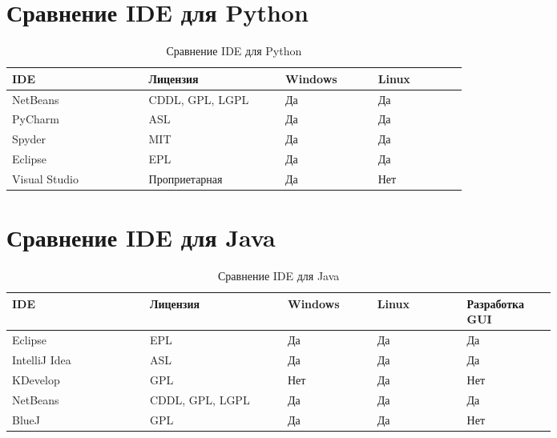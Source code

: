 \section{Сравнение IDE для Python}
\begin{table}[h!]
    \caption{Сравнение IDE для Python}
    \centering
    \begin{tabular}[h!]{| p{0.2\linewidth} | p{0.2\linewidth} | p{0.13\linewidth} | p{0.13\linewidth} |} 
        \hline
        \rowcolor{gray} IDE & Лицензия & Windows & Linux \\\hline\hline
        NetBeans & CDDL, GPL, LGPL  & Да \cellcolor{Red}   & Да \cellcolor{Red}  \\\hline
        PyCharm & ASL  & Да \cellcolor{Red}   & Да \cellcolor{Red} \\\hline
        Spyder & MIT  & Да \cellcolor{Red}   & Да \cellcolor{Red}  \\\hline
        Eclipse & EPL  & Да \cellcolor{Red}   & Да \cellcolor{Red}  \\\hline
        Visual Studio & Проприетарная  & Да \cellcolor{Red}   & Нет \cellcolor{green} \\\hline
    \end{tabular}
\end{table}
\newpage
\section{Сравнение IDE для Java}
\begin{table}[h!]
    \caption{Сравнение IDE для Java}
    \centering
    \begin{tabular}[h!]{| p{0.2\linewidth} | p{0.2\linewidth} | p{0.13\linewidth} | p{0.13\linewidth} | p{0.13\linewidth} |} 
        \hline
    \rowcolor{gray} IDE & Лицензия & Windows & Linux & Разработка GUI\\\hline\hline
    Eclipse & EPL  & Да \cellcolor{Red}   & Да \cellcolor{Red}   & Да \cellcolor{Red} \\\hline
    IntelliJ Idea &ASL  & Да \cellcolor{Red}   & Да \cellcolor{Red}  & Да \cellcolor{Red} \\\hline
    KDevelop & GPL  & Нет \cellcolor{green}   & Да \cellcolor{Red}   & Нет \cellcolor{green}  \\\hline
    NetBeans &CDDL, GPL, LGPL  & Да \cellcolor{Red}   & Да \cellcolor{Red}   & Да \cellcolor{Red} \\\hline
    BlueJ & GPL  & Да \cellcolor{Red}   & Да \cellcolor{Red}   & Нет \cellcolor{green} \\\hline

    \end{tabular}
\end{table}

